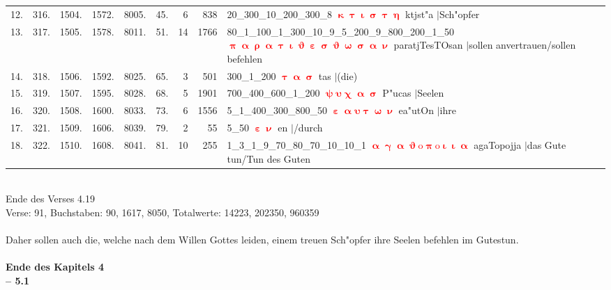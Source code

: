 \documentclass[a4paper,10pt,landscape]{article}
\begin{document}
\begin{tabular}{rrrrrrrrp{120mm}}
12.&316.&1504.&1572.&8005.&45.&6&838&20\_300\_10\_200\_300\_8 \textcolor{red}{$\boldsymbol{\upkappa\uptau\upiota\upsigma\uptau\upeta}$} ktjst"a $|$Sch"opfer\\
13.&317.&1505.&1578.&8011.&51.&14&1766&80\_1\_100\_1\_300\_10\_9\_5\_200\_9\_800\_200\_1\_50 \textcolor{red}{$\boldsymbol{\uppi\upalpha\uprho\upalpha\uptau\upiota\upvartheta\upepsilon\upsigma\upvartheta\upomega\upsigma\upalpha\upnu}$} paratjTesTOsan $|$sollen anvertrauen/sollen befehlen\\
14.&318.&1506.&1592.&8025.&65.&3&501&300\_1\_200 \textcolor{red}{$\boldsymbol{\uptau\upalpha\upsigma}$} tas $|$(die)\\
15.&319.&1507.&1595.&8028.&68.&5&1901&700\_400\_600\_1\_200 \textcolor{red}{$\boldsymbol{\uppsi\upsilon\upchi\upalpha\upsigma}$} P"ucas $|$Seelen\\
16.&320.&1508.&1600.&8033.&73.&6&1556&5\_1\_400\_300\_800\_50 \textcolor{red}{$\boldsymbol{\upepsilon\upalpha\upsilon\uptau\upomega\upnu}$} ea"utOn $|$ihre\\
17.&321.&1509.&1606.&8039.&79.&2&55&5\_50 \textcolor{red}{$\boldsymbol{\upepsilon\upnu}$} en $|$/durch\\
18.&322.&1510.&1608.&8041.&81.&10&255&1\_3\_1\_9\_70\_80\_70\_10\_10\_1 \textcolor{red}{$\boldsymbol{\upalpha\upgamma\upalpha\upvartheta\mathrm{o}\uppi\mathrm{o}\upiota\upiota\upalpha}$} agaTopojja $|$das Gute tun/Tun des Guten\\
\end{tabular}\medskip \\
Ende des Verses 4.19\\
Verse: 91, Buchstaben: 90, 1617, 8050, Totalwerte: 14223, 202350, 960359\\
\\
Daher sollen auch die, welche nach dem Willen Gottes leiden, einem treuen Sch"opfer ihre Seelen befehlen im Gutestun.\\
\\
{\bf Ende des Kapitels 4}\\
\newpage 
{\bf -- 5.1}\\
\medskip \\
\end{document}
